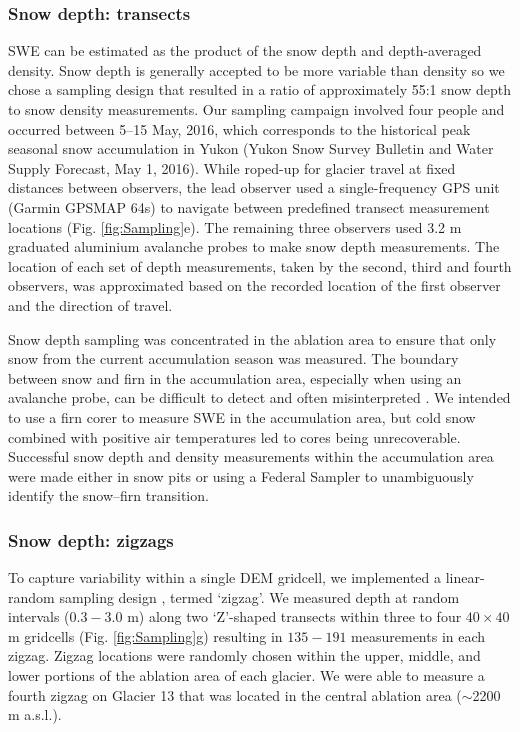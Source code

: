 \documentclass[twocolumn, letterpaper]{igs}
\begin{document}
\subsubsection{Snow depth: transects}

SWE can be estimated as the product of the snow depth and depth-averaged density. Snow depth is generally accepted to be more variable than density \citep{Elder1991, Clark2011, Lopez2013} so we chose a sampling design that resulted in a ratio of approximately 55:1 snow depth to snow density measurements. Our sampling campaign involved four people and occurred between 5--15 May, 2016, which corresponds to the historical peak seasonal snow accumulation in Yukon (Yukon Snow Survey Bulletin and Water Supply Forecast, May 1, 2016). While roped-up for glacier travel at fixed distances between observers, the lead observer used a single-frequency GPS unit (Garmin GPSMAP 64s) to navigate between predefined transect measurement locations (Fig. \ref{fig:Sampling}e). The remaining three observers used 3.2 m graduated aluminium avalanche probes to make snow depth measurements. The location of each set of depth measurements, taken by the second, third and fourth observers, was approximated based on the recorded location of the first observer and the direction of travel. 

Snow depth sampling was concentrated in the ablation area to ensure that only snow from the current accumulation season was measured. The boundary between snow and firn in the accumulation area, especially when using an avalanche probe, can be difficult to detect and often misinterpreted \citep{Grunewald2010,Sold2013}. We intended to use a firn corer to measure SWE in the accumulation area, but cold snow combined with positive air temperatures led to cores being unrecoverable. Successful snow depth and density measurements within the accumulation area were made either in snow pits or using a Federal Sampler to unambiguously identify the snow--firn transition. 

\subsubsection{Snow depth: zigzags}

To capture variability within a single DEM gridcell, we implemented a linear-random sampling design \citep{Shea2010}, termed `zigzag'. We measured depth at random intervals ($0.3 - 3.0$ m) along two `Z'-shaped transects within three to four $40\times40$ m gridcells (Fig. \ref{fig:Sampling}g) resulting in $135-191$ measurements in each zigzag. Zigzag locations were randomly chosen within the upper, middle, and lower portions of the ablation area of each glacier. We were able to measure a fourth zigzag on Glacier 13 that was located in the central ablation area ($\sim$2200 m a.s.l.).
\end{document}
